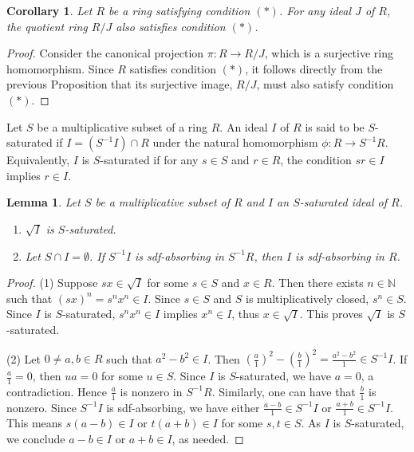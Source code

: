 \documentclass{amsart}%
\newtheorem{corollary}{Corollary}[section]
\newtheorem{lemma}{Lemma}[section]
\begin{document}
\begin{corollary}
Let $R$ be a ring satisfying condition $(\ast)$. For any ideal $J$ of $R$, the
quotient ring $R/J$ also satisfies condition $(\ast)$.
\end{corollary}

\begin{proof}
Consider the canonical projection $\pi:R\rightarrow R/J$, which is a
surjective ring homomorphism. Since $R$ satisfies condition $(\ast)$, it
follows directly from the previous Proposition that its surjective image,
$R/J$, must also satisfy condition $(\ast)$.
\end{proof}

Let $S$ be a multiplicative subset of a ring $R$. An ideal $I$ of $R$ is said
to be $S$-saturated if $I = (S^{-1}I) \cap R$ under the natural homomorphism
$\phi: R \to S^{-1}R$. Equivalently, $I$ is $S$-saturated if for any $s \in S$
and $r \in R$, the condition $sr \in I$ implies $r \in I$.

\begin{lemma}
\label{lemma} Let $S$ be a multiplicative subset of $R$ and $I$ an
$S$-saturated ideal of $R$.

\begin{enumerate}
\item $\sqrt{I}$ is $S$-saturated.

\item Let $S\cap I=\emptyset$. If $S^{-1}I$ is sdf-absorbing in $S^{-1}R$,
then $I$ is sdf-absorbing in $R$.
\end{enumerate}
\end{lemma}

\begin{proof}
(1) Suppose $sx\in\sqrt{I}$ for some $s\in S$ and $x\in R$. Then there exists
$n\in\mathbb{N}$ such that $(sx)^{n}=s^{n}x^{n}\in I$. Since $s\in S$ and $S$
is multiplicatively closed, $s^{n}\in S$. Since $I$ is $S$-saturated,
$s^{n}x^{n}\in I$ implies $x^{n}\in I$, thus $x\in\sqrt{I}$. This proves
$\sqrt{I}$ is $S$-saturated.

(2) Let $0\neq a,b\in R$ such that $a^{2}-b^{2}\in I$. Then $\left(  \frac
{a}{1}\right)  ^{2}-\left(  \frac{b}{1}\right)  ^{2}=\frac{a^{2}-b^{2}}{1}\in
S^{-1}I$. If $\frac{a}{1}=0$, then $ua=0$ for some $u\in S.$ Since $I$ is
$S$-saturated, we have $a=0$, a contradiction. Hence $\frac{a}{1}$ is nonzero
in $S^{-1}R.$ Similarly, one can have that $\frac{b}{1}$ is nonzero. Since
$S^{-1}I$ is sdf-absorbing, we have either $\frac{a-b}{1}\in S^{-1}I$ or
$\frac{a+b}{1}\in S^{-1}I$. This means $s(a-b)\in I$ or $t(a+b)\in I$ for some
$s,t\in S$. As $I$ is $S$-saturated, we conclude $a-b\in I$ or $a+b\in I$, as needed.
\end{proof}
\end{document}
